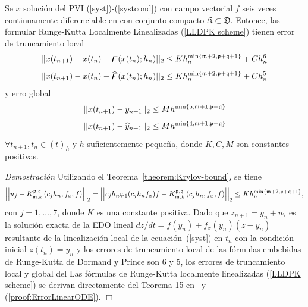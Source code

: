 \begin{theorem}\label{theorem:lldp-convergence}
	Se $x$ solución del PVI (\ref{syst})-(\ref{systcond}) con campo vectorial $f$ seis veces continuamente diferenciable en con conjunto compacto $\mathfrak{K} \subset \mathfrak{D}$. Entonce, las formular Runge-Kutta Localmente Linealizadas (\ref{LLDPK scheme}) tienen error de truncamiento local
	\[\lvert\lvert x(t_{n+1}) - x(t_n) - \digamma(x(t_n);h_n) \rvert\rvert_2 \leq Kh_n^{\mathrm{min}\left\{ \mathfrak{m}+2,\mathfrak{p}+\mathfrak{q}+1 \right\}}+C h_n^{6}  \]
	\[\lvert\lvert x(t_{n+1}) - x(t_n) - \widehat{\digamma }(x(t_n);h_n) \rvert\rvert_2 \leq Kh_n^{\mathrm{min}\left\{ \mathfrak{m}+2,\mathfrak{p}+\mathfrak{q}+1 \right\}}+C h_n^{5}  \]
	y erro global
	\[ \lvert\lvert x(t_{n+1}) - y_{n+1} \rvert\rvert_2 \leq M h^{\mathrm{min}\left\{5,\mathfrak{m}+1,\mathfrak{p}+\mathfrak{q} \right\}} \]
	\[ \lvert\lvert x(t_{n+1}) - \widehat{y}_{n+1} \rvert\rvert_2 \leq M h^{\mathrm{min}\left\{ 4,\mathfrak{m}+1,\mathfrak{p}+\mathfrak{q} \right\}} \]
	$\forall t_{n+1},t_n\in(t)_h$ y $h$ suficientemente pequeña, donde  $K,C,M$ son constantes positivas.
\end{theorem}
\emph{Demostración} Utilizando el Teorema~\ref{theorem:Krylov-bound}, se tiene
\begin{equation}\label{proof:ErrorLinearODE}
\left\lvert \left\lvert  u_j-K_{\mathfrak{m},k}^{\mathfrak{p},\mathfrak{q}}\left(c_j h_n,f_x , f \right)  \right\rvert \right\rvert_2 =  \left\lvert \left\lvert c_jh_n\varphi_1(c_jh_nf_x)f - K_{\mathfrak{m},k}^{\mathfrak{p},\mathfrak{q}}\left(c_j h_n, f_x , f \right)  \right\rvert \right\rvert_2 \le Kh_n^{\mathrm{min}\left\{ \mathfrak{m}+2,\mathfrak{p}+\mathfrak{q}+1 \right\}},
\end{equation}
con $j=1,\ldots,7$, donde $K$ es una constante positiva. Dado que $z_{n+1} = y_n + u_7$ es la solución exacta de la EDO lineal $dz/dt=f(y_n)+f_x(y_n)(z-y_n)$ resultante de la linealización local de la ecuación~(\ref{syst}) en $t_n$ con la condición inicial $z(t_n)=y_n$ y los errores de truncamiento local de las fórmulas embebidas de Runge-Kutta de Dormand y Prince son 6 y 5, los errores de truncamiento local y global del Las fórmulas de Runge-Kutta localmente linealizadas (\ref{LLDPK scheme}) se derivan directamente del Teorema 15 en~\cite{Jimenez13} y (\ref{proof:ErrorLinearODE}). $\Box$\\

